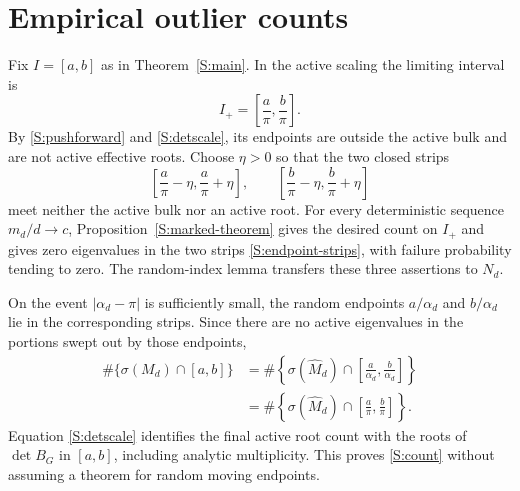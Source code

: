 \section{Empirical outlier counts}

Fix $I=[a,b]$ as in Theorem~\ref{S:main}. In the active scaling the limiting interval is
\begin{equation}
I_+=\left[\frac a\pi,\frac b\pi\right].
\end{equation}
By \eqref{S:pushforward} and \eqref{S:detscale}, its endpoints are outside the active bulk and are
not active effective roots. Choose $\eta>0$ so that the two closed strips
\begin{equation}
\left[\frac a\pi-\eta,\frac a\pi+\eta\right],
\qquad
\left[\frac b\pi-\eta,\frac b\pi+\eta\right]
\label{S:endpoint-strips}
\end{equation}
meet neither the active bulk nor an active root. For every deterministic sequence $m_d/d\to c$,
Proposition~\ref{S:marked-theorem} gives the desired count on $I_+$ and gives zero eigenvalues in
the two strips \eqref{S:endpoint-strips}, with failure probability tending to zero. The
random-index lemma transfers these three assertions to $N_d$.

On the event $|\alpha_d-\pi|$ is sufficiently small, the random endpoints
$a/\alpha_d$ and $b/\alpha_d$ lie in the corresponding strips. Since there are no active
eigenvalues in the portions swept out by those endpoints,
\begin{align}
\#\{\sigma(M_d)\cap[a,b]\}
&=
\#\left\{\sigma(\widehat M_d)\cap
\left[\frac a{\alpha_d},\frac b{\alpha_d}\right]\right\}\\
&=
\#\left\{\sigma(\widehat M_d)\cap
\left[\frac a\pi,\frac b\pi\right]\right\}.
\label{S:scaled-count}
\end{align}
Equation \eqref{S:detscale} identifies the final active root count with the roots of
$\det B_G$ in $[a,b]$, including analytic multiplicity. This proves \eqref{S:count} without
assuming a theorem for random moving endpoints.


